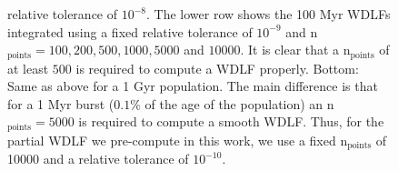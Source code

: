 \documentclass[fleqn,usenatbib]{mnras}
\begin{document}
\begin{figure}
{    relative tolerance of $10^{-8}$. The lower row shows the 100 Myr WDLFs
    integrated using a fixed relative tolerance of $10^{-9}$ and
    n$_{\mathrm{points}} = 100, 200, 500, 1000, 5000$ and $10000$. It is clear
    that a n$_{\mathrm{points}}$ of at least $500$ is required to compute a
    WDLF properly. Bottom: Same as above for a 1 Gyr population. The main
    difference is that for a 1 Myr burst ($0.1\%$ of the age of the population)
    an n$_{\mathrm{points}}=5000$ is required to compute a smooth WDLF. Thus,
    for the partial WDLF we pre-compute in this work, we use a fixed
    n$_{\mathrm{points}}$ of 10000 and a relative tolerance of $10^{-10}$.}
    \label{fig:integration-precision}
\end{figure}

\bsp	%
\label{lastpage}
\end{document}
